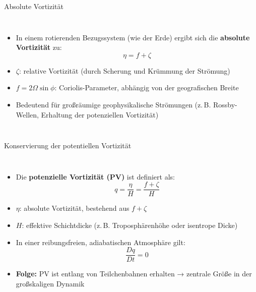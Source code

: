 \begin{frame}{Absolute Vortizität}
  \begin{columns}
    \begin{itemize}
      \item In einem rotierenden Bezugssystem (wie der Erde) ergibt sich die \textbf{absolute Vortizität} zu:
      \[
        \eta = f + \zeta
      \]
      \item \( \zeta \): relative Vortizität (durch Scherung und Krümmung der Strömung)
      \item \( f = 2\Omega \sin\phi \): Coriolis-Parameter, abhängig von der geografischen Breite
      \item Bedeutend für großräumige geophysikalische Strömungen (z.\,B. Rossby-Wellen, Erhaltung der potenziellen Vortizität)
    \end{itemize}

    \vspace{2cm}
  \end{columns}
\end{frame}


\begin{frame}{Konservierung der potentiellen Vortizität}
  \begin{columns}
    \begin{itemize}
      \item Die \textbf{potenzielle Vortizität (PV)} ist definiert als:
      \[
        q = \frac{\eta}{H} = \frac{f + \zeta}{H}
      \]
      \item \( \eta \): absolute Vortizität, bestehend aus \( f + \zeta \)
      \item \( H \): effektive Schichtdicke (z.\,B. Troposphärenhöhe oder isentrope Dicke)
      \item In einer reibungsfreien, adiabatischen Atmosphäre gilt:
      \[
        \frac{Dq}{Dt} = 0
      \]
      \item \textbf{Folge:} PV ist entlang von Teilchenbahnen erhalten → zentrale Größe in der großskaligen Dynamik
    \end{itemize}

    \vspace{2cm}
  \end{columns}
\end{frame}



